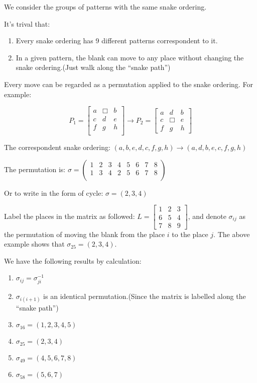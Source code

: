 We consider the groups of patterns with the same snake ordering.

It's trival that:
\begin{enumerate}
    \item Every snake ordering has 9 different patterns correspondent to it.
    \item In a given pattern, the blank can move to any place without changing the snake ordering.(Just walk along the ``snake path'')
\end{enumerate}

Every move can be regarded as a permutation applied to the snake ordering. For example:

\[ P_1 = \begin{bmatrix}a &\Box&b\\c&d&e\\f&g&h\\\end{bmatrix}  \rightarrow P_2 = \begin{bmatrix}a&d&b\\c&\Box&e\\f&g&h\end{bmatrix}\]

The correspondent snake ordering: $ (a,b,e,d,c,f,g,h)\rightarrow (a,d,b,e,c,f,g,h)$

The permutation is: $ \sigma = \begin{pmatrix}1&2&3&4&5&6&7&8\\1&3&4&2&5&6&7&8\\\end{pmatrix}$

Or to write in the form of cycle: $ \sigma = (2,3,4)$
\vspace{3em}

Label the places in the matrix as followed: $ L = \begin{bmatrix}1&2&3\\6&5&4\\7&8&9\end{bmatrix}$, and denote $ \sigma_{ij}$ as the
permutation of moving the blank from the place $ i$ to the place $ j$. The above example shows that $ \sigma_{25} = (2,3,4)$.

We have the following results by calculation:
\begin{enumerate}
    \item $ \sigma_{ij}= \sigma_{ji}^{-1}$
      \item $ \sigma_{i(i+1)}$ is an identical permutation.(Since the matrix is labelled along the ``snake path'')
          \item$  \sigma_{16} = (1,2,3,4,5)$
          \item$  \sigma_{25} = (2,3,4)$
          \item$  \sigma_{49} = (4,5,6,7,8)$
          \item$  \sigma_{58} = (5,6,7)$
\end{enumerate}

